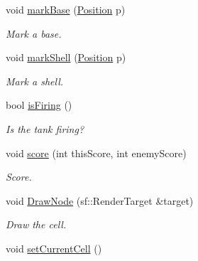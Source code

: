 \begin{DoxyCompactItemize}
\mbox{\label{class_c_w_tank_aa9d187d34afdf60750da9fe184f62b75}} 
void \mbox{\hyperlink{class_c_w_tank_aa9d187d34afdf60750da9fe184f62b75}{mark\+Base}} (\mbox{\hyperlink{class_position}{Position}} p)
\begin{DoxyCompactList}\small\item\em Mark a base. \end{DoxyCompactList}\item 
\mbox{\label{class_c_w_tank_aacb17e0a669da6e27ab75d7df088bca7}} 
void \mbox{\hyperlink{class_c_w_tank_aacb17e0a669da6e27ab75d7df088bca7}{mark\+Shell}} (\mbox{\hyperlink{class_position}{Position}} p)
\begin{DoxyCompactList}\small\item\em Mark a shell. \end{DoxyCompactList}\item 
\mbox{\label{class_c_w_tank_ad03d72ab86ab812ea72c786921370d8b}} 
bool \mbox{\hyperlink{class_c_w_tank_ad03d72ab86ab812ea72c786921370d8b}{is\+Firing}} ()
\begin{DoxyCompactList}\small\item\em Is the tank firing? \end{DoxyCompactList}\item 
\mbox{\label{class_c_w_tank_abb42d292824aca3b25e8868c9fe43302}} 
void \mbox{\hyperlink{class_c_w_tank_abb42d292824aca3b25e8868c9fe43302}{score}} (int this\+Score, int enemy\+Score)
\begin{DoxyCompactList}\small\item\em Score. \end{DoxyCompactList}\item 
\mbox{\label{class_c_w_tank_a17113de02508affb4fbe15746ac977ac}} 
void \mbox{\hyperlink{class_c_w_tank_a17113de02508affb4fbe15746ac977ac}{Draw\+Node}} (sf\+::\+Render\+Target \&target)
\begin{DoxyCompactList}\small\item\em Draw the cell. \end{DoxyCompactList}\item 
\mbox{\label{class_c_w_tank_a37dd45ebdba39debcd9d1bc44e2ca992}} 
void \mbox{\hyperlink{class_c_w_tank_a37dd45ebdba39debcd9d1bc44e2ca992}{set\+Current\+Cell}} ()

\end{DoxyCompactItemize}
